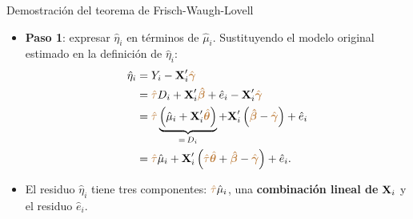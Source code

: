 \documentclass[9pt, xcolor=dvipsnames]{beamer}
\begin{document}
\begin{frame}{Demostración del teorema de Frisch-Waugh-Lovell}
\begin{itemize}
    \item \textbf{Paso 1}: expresar \(\hat{\eta}_i\) en términos de \(\hat{\mu}_i\). Sustituyendo el modelo original estimado en la definición de \(\hat{\eta}_i\):
    \begin{align*}
    \begin{split}
        \hat{\eta}_i &= Y_i - \textbf{X}'_i \textcolor{brown}{\hat{\boldsymbol{\gamma}}} \\
        &= \textcolor{brown}{\hat{\tau}} D_i + \textbf{X}'_i\textcolor{brown}{\boldsymbol{\hat{\beta}}} + \hat{e}_i - \textbf{X}'_i \textcolor{brown}{\hat{\boldsymbol{\gamma}}} \\
        &= \textcolor{brown}{\hat{\tau}} \underbrace{\left(\hat{\mu}_i + \textbf{X}'_i\textcolor{brown}{\hat{\boldsymbol{\theta}}}\right)}_{=\, D_i} + \textbf{X}'_i\left(\textcolor{brown}{\boldsymbol{\hat{\beta}}} - \textcolor{brown}{\hat{\boldsymbol{\gamma}}}\right) + \hat{e}_i \\
        &= \textcolor{brown}{\hat{\tau}} \hat{\mu}_i + \textbf{X}'_i\left(\textcolor{brown}{\hat{\tau}}\textcolor{brown}{\hat{\boldsymbol{\theta}}} + \textcolor{brown}{\boldsymbol{\hat{\beta}}} - \textcolor{brown}{\hat{\boldsymbol{\gamma}}}\right) + \hat{e}_i.
    \end{split}
    \end{align*}
    \item El residuo \(\hat{\eta}_i\) tiene tres componentes: \(\textcolor{brown}{\hat{\tau}} \hat{\mu}_i\), una \textbf{combinación lineal de} \(\textbf{X}_i\) y el residuo \(\hat{e}_i\).
\end{itemize}
\end{frame}
\end{document}
